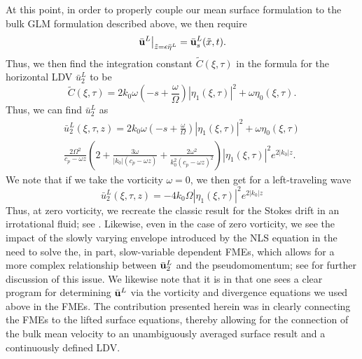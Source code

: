 \documentclass{JFM_Style/jfm}
\begin{document}
At this point, in order to properly couple our mean surface formulation to the bulk GLM formulation described above, we then require
\[
\left.\bar{{\bf u}}^{L}\right|_{\tilde{z}=\epsilon \bar{\eta}^{L}} = \bar{{\bf u}}^{L}_{s}(\tilde{x},t).
\]
Thus, we then find the integration constant $\tilde{C}(\xi,\tau)$ in the formula for the horizontal LDV $\bar{u}^{L}_{2}$ to be
\[
\tilde{C}(\xi,\tau) = 2k_{0}\omega\left(-s + \frac{\omega}{\Omega} \right)|\eta_{1}(\xi,\tau)|^{2} + \omega \eta_{0}(\xi,\tau).
\]
Thus, we can find $\bar{u}_{2}^{L}$ as
\begin{multline*}
\bar{u}^{L}_{2}(\xi,\tau,z) = 2k_{0}\omega\left(-s + \frac{\omega}{\Omega} \right)|\eta_{1}(\xi,\tau)|^{2} + \omega \eta_{0}(\xi,\tau) \\
\frac{2\Omega^{2} }{c_{p}-\omega z}\left( 2 + \frac{3\omega}{|k_{0}|(c_{p}-\omega z)}+\frac{2\omega^{2}}{k_{0}^{2}(c_{p}-\omega z)^{2}}\right)|\eta_{1}(\xi,\tau)|^{2} e^{2|k_{0}|z}.
\end{multline*}
We note that if we take the vorticity $\omega=0$, we then get for a left-traveling wave
\[
\bar{u}^{L}_{2}(\xi,\tau,z) = -4k_{0}\Omega|\eta_{1}(\xi,\tau)|^{2}e^{2|k_{0}|z}
\]
Thus, at zero vorticity, we recreate the classic result for the Stokes drift in an irrotational fluid; see \cite{longuet}.  Likewise, even in the case of zero vorticity, we see the impact of the slowly varying envelope introduced by the NLS equation in the need to solve the, in part, slow-variable dependent FMEs, which allows for a more complex relationship between $\bar{{\bf u}}^{L}_{2}$ and the pseudomomentum; see \cite{buhler} for further discussion of this issue.  We likewise note that it is in \cite{buhler} that one sees a clear program for determining $\bar{{\bf u}}^{L}$ via the vorticity and divergence equations we used above in the FMEs.  The contribution presented herein was in clearly connecting the FMEs to the lifted surface equations, thereby allowing for the connection of the bulk mean velocity to an unambiguously averaged surface result and a continuously defined LDV.
\end{document}
